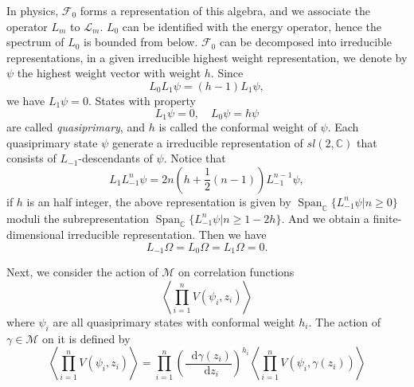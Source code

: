 \documentclass[10pt,reqno,draft]{article}
\newcommand{\dd}{\mathop{}\!\mathrm{d}}
\numberwithin{equation}{section}
\numberwithin{figure}{section}
\numberwithin{table}{section}
\theoremstyle{plain}
\theoremstyle{definition}
\theoremstyle{remark}
\begin{document}
	In physics, \(\mathcal{F}_{0}\) forms a representation of this algebra, and we associate the operator \(L_{m}\) to \(\mathcal{L}_{m}\). \(L_{0}\) can be identified with the energy operator, hence the spectrum of \(L_{0}\) is bounded from below. \(\mathcal{F}_{0}\) can be decomposed into irreducible representations, in a given irreducible highest weight representation, we denote by \(\psi\) the highest weight vector with weight \(h\). Since 
	\begin{equation}
	  L_{0}L_{1}\psi=\left( h-1 \right) L_{1}\psi,
	\end{equation}
	we have \(L_{1}\psi=0\). States with property 
	\begin{equation}
	  L_1\psi=0,\quad L_0\psi=h\psi
	\end{equation}
	are called \emph{quasiprimary}, and \(h\) is called the conformal weight of \(\psi\). Each quasiprimary state \(\psi\) generate a irreducible representation of \(sl(2,\mathbb{C})\) that consists of \(L_{-1}\)-descendants of \(\psi\). Notice that 
	\begin{equation}
	  L_1L_{-1}^{n}\psi=2n\left( h+\frac{1}{2}(n-1) \right) L_{-1}^{n-1}\psi,
	\end{equation}
	if \(h\) is an half integer, the above representation is given by \(\operatorname{ Span }_{\mathbb{C}}\{L_{-1}^{n}\psi|n\ge 0\} \) moduli the subrepresentation \(\operatorname{ Span } _{\mathbb{C}}\{L_{-1}^{n}\psi|n\ge 1-2h\} \). And we obtain a finite-dimensional irreducible representation. Then we have
	\begin{equation}
	  L_{-1}\Omega=L_{0}\Omega=L_1\Omega=0.
	\end{equation}

	Next, we consider the action of \(\mathcal{M}\) on correlation functions 
	\begin{equation}
	  \left<\prod_{i=1}^{n} V\left( \psi_{i},z_{i} \right)   \right>
	\end{equation}
	where \(\psi_{i}\) are all quasiprimary states with conformal weight \(h_{i}\). The action of \(\gamma\in \mathcal{M}\) on it is defined by 
	\begin{equation}
	  \left<\prod_{i=1}^{n} V\left( \psi_{i},z_{i} \right)   \right>=\prod_{i=1}^{n} \left( \frac{\dd \gamma\left( z_{i} \right) }{\dd z_{i}} \right)^{h_{i}} \left<\prod_{i=1}^{n} V\left( \psi_{i},\gamma\left( z_{i} \right) \right)   \right>
	\end{equation}


    
    
\end{document}
